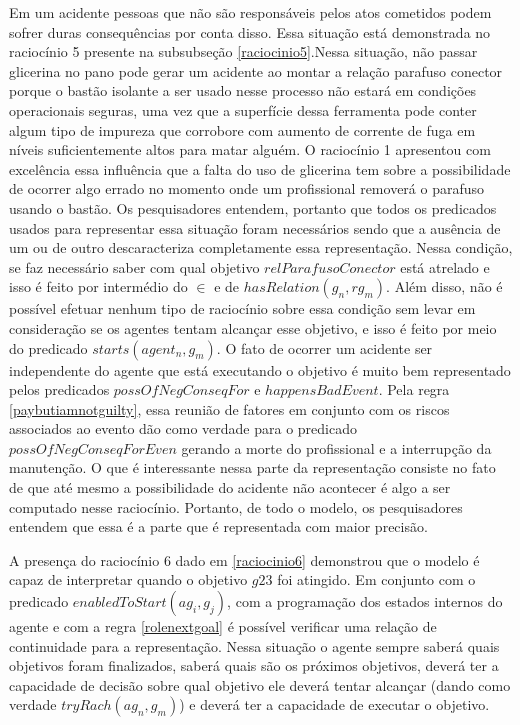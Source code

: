 Em um acidente pessoas que não são responsáveis pelos atos cometidos podem sofrer duras consequências por conta disso. Essa situação está demonstrada no raciocínio 5 presente na subsubseção \ref{raciocinio5}.Nessa situação, não passar glicerina no pano pode gerar um acidente ao montar a relação parafuso conector porque o bastão isolante a ser usado nesse  processo não estará em condições operacionais seguras, uma vez que a superfície dessa ferramenta pode 
conter algum tipo de impureza que corrobore com aumento de corrente de fuga em níveis suficientemente altos para matar alguém. O raciocínio 1 apresentou com excelência essa influência que a falta do uso de glicerina tem sobre a possibilidade de ocorrer algo errado no momento onde um profissional removerá o parafuso usando o bastão. Os pesquisadores entendem, portanto que todos os predicados usados para representar essa situação foram necessários sendo que a ausência de um ou de outro descaracteriza completamente essa representação. Nessa condição, se faz necessário saber com qual objetivo $relParafusoConector$ está atrelado e isso é feito por intermédio do $\in$ e de $hasRelation(g_n,rg_m)$. Além disso, não é possível efetuar nenhum tipo de raciocínio sobre essa condição sem levar em consideração se os agentes tentam alcançar esse objetivo, e isso é feito por meio do predicado $starts(agent_n,g_m)$. O fato de ocorrer um acidente ser independente do agente que está executando o objetivo é muito bem representado pelos predicados $possOfNegConseqFor$ e $happensBadEvent$. Pela regra \ref{paybutiamnotguilty}, essa reunião de fatores em conjunto com os riscos associados ao evento dão como verdade para o predicado $possOfNegConseqForEven$ gerando a morte do profissional e a interrupção da manutenção. O que é interessante nessa parte da representação consiste no fato de que até mesmo a possibilidade do acidente não acontecer é algo a ser computado nesse raciocínio. Portanto, de todo o modelo, os pesquisadores entendem que essa é a parte que é representada com maior precisão. 

A presença do raciocínio 6 dado em \ref{raciocinio6} demonstrou que o modelo é capaz de interpretar quando o objetivo $g23$ foi atingido. Em conjunto com o predicado $enabledToStart(ag_i,g_j)$, com a programação dos estados internos do agente e com a regra \ref{rolenextgoal} é possível verificar uma relação de continuidade para a representação. Nessa situação o agente sempre saberá quais objetivos foram finalizados, saberá quais são os próximos objetivos, deverá ter a capacidade de decisão sobre qual objetivo ele deverá tentar alcançar (dando como verdade $tryRach(ag_n,g_m)$) e deverá ter a capacidade de executar o objetivo. 

